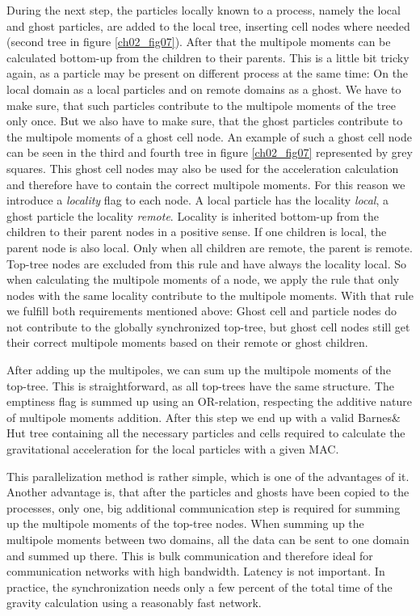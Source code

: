 During the next step, the particles locally known to a process, namely the local and ghost particles, are added to the local tree, inserting cell nodes where needed (second tree in figure \ref{ch02_fig07}). After that the multipole moments can be calculated bottom-up from the children to their parents. This is a little bit tricky again, as a particle may be present on different process at the same time: On the local domain as a local particles and on remote domains as a ghost. We have to make sure, that such particles contribute to the multipole moments of the tree only once. But we also have to make sure, that the ghost particles contribute to the multipole moments of a ghost cell node. An example of such a ghost cell node can be seen in the third and fourth tree in figure \ref{ch02_fig07} represented by grey squares. This ghost cell nodes may also be used for the acceleration calculation and therefore have to contain the correct multipole moments. For this reason we introduce a \emph{locality} flag to each node. A local particle has the locality \emph{local}, a ghost particle the locality \emph{remote}. Locality is inherited bottom-up from the children to their parent nodes in a positive sense. If one children is local, the parent node is also local. Only when all children are remote, the parent is remote. Top-tree nodes are excluded from this rule and have always the locality local. So when calculating the multipole moments of a node, we apply the rule that only nodes with the same locality contribute to the multipole moments. With that rule we fulfill both requirements mentioned above: Ghost cell and particle nodes do not contribute to the globally synchronized top-tree, but ghost cell nodes still get their correct multipole moments based on their remote or ghost children.

After adding up the multipoles, we can sum up the multipole moments of the top-tree. This is straightforward, as all top-trees have the same structure. The emptiness flag is summed up using an OR-relation, respecting the additive nature of multipole moments addition. After this step we end up with a valid Barnes\& Hut tree containing all the necessary particles and cells required to calculate the gravitational acceleration for the local particles with a given MAC.

This parallelization method is rather simple, which is one of the advantages of it. Another advantage is, that after the particles and ghosts have been copied to the processes, only one, big additional communication step is required for summing up the multipole moments of the top-tree nodes. When summing up the multipole moments between two domains, all the data can be sent to one domain and summed up there. This is bulk communication and therefore ideal for communication networks with high bandwidth. Latency is not important. In practice, the synchronization needs only a few percent of the total time of the gravity calculation using a reasonably fast network.

